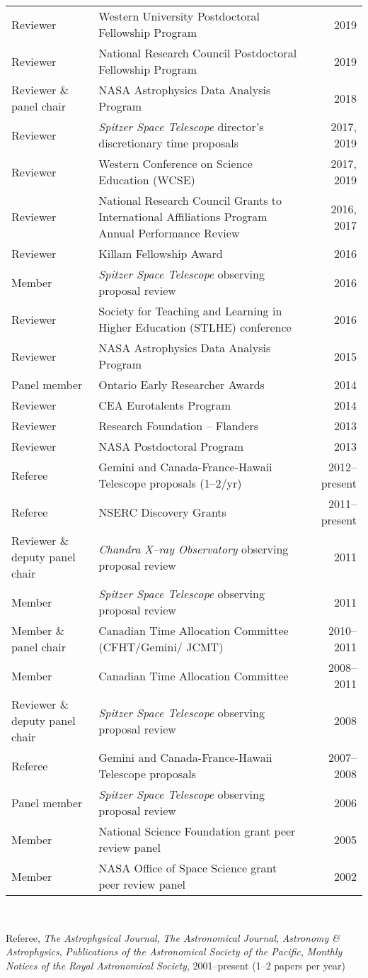 \begin{tabularx}{\textwidth}{lXr}
Reviewer &Western University Postdoctoral Fellowship Program& 2019\\
Reviewer &National Research Council Postdoctoral Fellowship Program& 2019\\
Reviewer \& panel chair& NASA Astrophysics Data Analysis Program& 2018\\
Reviewer & {\it Spitzer Space Telescope\/} director's discretionary time proposals & 2017, 2019\\
Reviewer & Western Conference on Science Education (WCSE) & 2017, 2019\\
Reviewer & National Research Council Grants to International Affiliations Program Annual Performance Review & 2016, 2017\\
Reviewer & Killam Fellowship Award & 2016\\
Member& {\it Spitzer Space Telescope\/} observing proposal review&  2016\\
Reviewer & Society for Teaching and Learning in Higher Education (STLHE) conference & 2016\\
Reviewer& NASA Astrophysics Data Analysis Program& 2015\\
Panel member & Ontario Early Researcher Awards & 2014\\
Reviewer&  CEA Eurotalents Program & 2014\\
Reviewer& Research Foundation -- Flanders& 2013\\
Reviewer& NASA Postdoctoral Program& 2013\\
Referee& Gemini and Canada-France-Hawaii Telescope proposals (1--2/yr)& 2012--present\\
Referee& NSERC Discovery Grants& 2011--present\\
Reviewer \& deputy panel chair& {\it Chandra X--ray Observatory\/} observing proposal review& 2011\\
Member& {\it Spitzer Space Telescope\/} observing proposal review&  2011\\
Member \& panel chair& Canadian Time Allocation Committee (CFHT/Gemini/ JCMT)& 2010--2011\\
Member& Canadian Time Allocation Committee& 2008--2011\\
Reviewer \& deputy panel chair& {\it Spitzer Space Telescope\/} observing proposal review& 2008\\
Referee& Gemini and Canada-France-Hawaii Telescope proposals& 2007--2008\\
Panel member& {\it Spitzer Space Telescope\/} observing proposal review& 2006\\
Member& National Science Foundation grant peer review panel& 2005\\
Member& NASA Office of Space Science grant peer review panel& 2002\\
\end{tabularx}\\
\vspace{0.3cm}

Referee, {\it The Astrophysical Journal}, {\it The Astronomical Journal}, {\it Astronomy \& Astrophysics},
{\it Publications of the Astronomical Society of the Pacific}, {\it Monthly Notices of the Royal Astronomical Society},
2001--present (1--2 papers per year)
